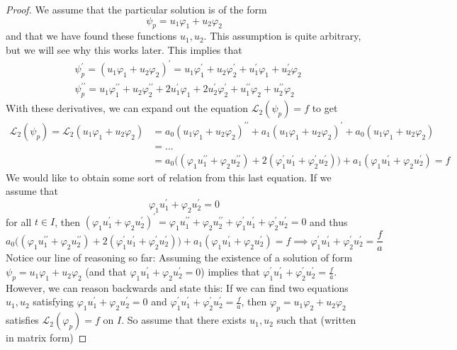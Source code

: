 \documentclass{article}
\theoremstyle{remark}
\theoremstyle{definition}
\begin{document}
\begin{proof}
We assume that the particular solution is of the form 
\[\psi_p = u_1 \varphi_1 + u_2 \varphi_2\]
and that we have found these functions $u_1, u_2$. This assumption is quite arbitrary, but we will see why this works later. This implies that
\begin{align*}
    &\psi_p^\prime = (u_1 \varphi_1 + u_2 \varphi_2)^\prime  = u_1 \varphi_1^\prime + u_2 \varphi_2^\prime + u_1^\prime \varphi_1 + u_2^\prime \varphi_2 \\
    & \psi_p^{\prime \prime} = u_1 \varphi_1^{\prime \prime} + u_2 \varphi_2^{\prime \prime} + 2 u_1^\prime \varphi_1 + 2 u_2^\prime \varphi_2^\prime + u_1^{\prime \prime} \varphi_2 + u_2^{\prime \prime} \varphi_2
\end{align*}
With these derivatives, we can expand out the equation $\mathcal{L}_2 (\psi_p) = f$ to get
\begin{align*}
    \mathcal{L}_2(\psi_p) = \mathcal{L}_2 (u_1 \varphi_1 + u_2 \varphi_2) & = a_0 (u_1 \varphi_1 + u_2 \varphi_2)^{\prime\prime} + a_1 (u_1 \varphi_1 + u_2 \varphi_2)^{\prime} + a_0 (u_1 \varphi_1 + u_2 \varphi_2) \\
    & = ... \\
    & = a_0 \big( (\varphi_1 u_1^{\prime\prime} + \varphi_2 u_2^{\prime \prime}) + 2(\varphi_1^\prime u_1^\prime + \varphi_2^\prime u_2^\prime)\big) + a_1 (\varphi_1 u_1^\prime + \varphi_2 u_2^\prime) = f
\end{align*}
We would like to obtain some sort of relation from this last equation. If we assume that 
\[\varphi_1 u_1^\prime + \varphi_2 u_2^\prime = 0\]
for all $t \in I$, then $(\varphi_1 u_1^\prime + \varphi_2 u_2^\prime)^\prime = \varphi_1 u_1^{\prime\prime} + \varphi_2 u_2^{\prime\prime} + \varphi_1^\prime u_1^{\prime} + \varphi_2^\prime u_2^{\prime} = 0$ and thus
\[a_0 \big( (\varphi_1 u_1^{\prime\prime} + \varphi_2 u_2^{\prime \prime}) + 2(\varphi_1^\prime u_1^\prime + \varphi_2^\prime u_2^\prime)\big) + a_1 (\varphi_1 u_1^\prime + \varphi_2 u_2^\prime) = f \implies \varphi_1^\prime u_1^\prime + \varphi_2^\prime u_2^\prime = \frac{f}{a}\]
Notice our line of reasoning so far: Assuming the existence of a solution of form $\psi_p = u_1 \varphi_1 + u_2 \varphi_2$ (and that $\varphi_1 u_1^\prime + \varphi_2 u_2^\prime = 0$) implies that $\varphi_1^\prime u_1^\prime + \varphi_2^\prime u_2^\prime = \frac{f}{a}$. However, we can reason backwards and state this: If we can find two equations $u_1, u_2$ satisfying $\varphi_1 u_1^\prime + \varphi_2 u_2^\prime = 0$ and $\varphi_1^\prime u_1^\prime + \varphi_2^\prime u_2^\prime = \frac{f}{a}$, then $\varphi_p = u_1 \varphi_2 + u_2 \varphi_2$ satisfies $\mathcal{L}_2 (\varphi_p) = f$ on $I$. So assume that there exists $u_1, u_2$ such that (written in matrix form)

\end{proof}
\end{document}
